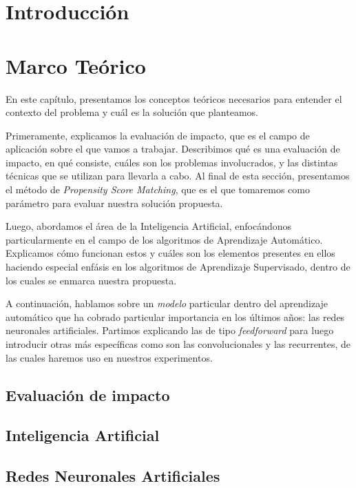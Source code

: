 \documentclass[a4paper,12pt,spanish]{book}
\begin{document}
\tableofcontents
\clearpage

\chapter{Introducción}


\chapter{Marco Teórico}
En este capítulo, presentamos los conceptos teóricos necesarios para entender el contexto
del problema y cuál es la solución que planteamos.

Primeramente, explicamos la evaluación de impacto, que es el campo de aplicación sobre el
que vamos a trabajar. Describimos qué es una evaluación de impacto, en qué consiste,
cuáles son los problemas involucrados, y las distintas técnicas que se utilizan para
llevarla a cabo. Al final de esta sección, presentamos el método de \textit{Propensity
Score Matching}, que es el que tomaremos como parámetro para evaluar nuestra solución
propuesta.

Luego, abordamos el área de la Inteligencia Artificial, enfocándonos particularmente
en el campo de los algoritmos de Aprendizaje Automático. Explicamos cómo funcionan estos y
cuáles son los elementos presentes en ellos haciendo especial enfásis en los algoritmos de
Aprendizaje Supervisado, dentro de los cuales se enmarca nuestra propuesta.

A continuación, hablamos sobre un \textit{modelo} particular dentro del aprendizaje
automático que ha cobrado particular importancia en los últimos años: las redes neuronales
artificiales. Partimos explicando las de tipo \textit{feedforward} para luego introducir
otras más específicas como son las convolucionales y las recurrentes, de las cuales
haremos uso en nuestros experimentos.

\section{Evaluación de impacto}


\section{Inteligencia Artificial}


\section{Redes Neuronales Artificiales} \label{sec:rna}

\end{document}
